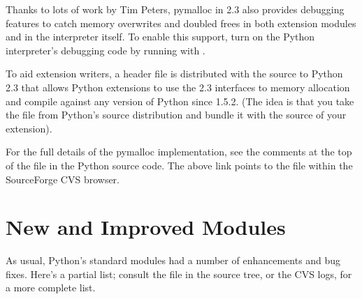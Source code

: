 \documentclass{howto}
\begin{document}
Thanks to lots of work by Tim Peters, pymalloc in 2.3 also provides
debugging features to catch memory overwrites and doubled frees in
both extension modules and in the interpreter itself.  To enable this
support, turn on the Python interpreter's debugging code by running
 with .  

To aid extension writers, a header file  is
distributed with the source to Python 2.3 that allows Python
extensions to use the 2.3 interfaces to memory allocation and compile
against any version of Python since 1.5.2.  (The idea is that you take
the file from Python's source distribution and bundle it with the
source of your extension).

\begin{seealso}

{For the full details of the pymalloc implementation, see
the comments at the top of the file  in the
Python source code.  The above link points to the file within the
SourceForge CVS browser.}

\end{seealso}

\section{New and Improved Modules}

As usual, Python's standard modules had a number of enhancements and
bug fixes.  Here's a partial list; consult the  file
in the source tree, or the CVS logs, for a more complete list.
\end{document}
